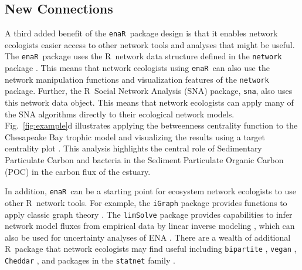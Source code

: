\documentclass[11pt]{article}
\newcommand{\R}{R}
\newcommand{\enaR}{\texttt{enaR}}
\begin{document}
\begin{spacing}{2}
\subsection{New Connections}
A third added benefit of the \enaR\ package design is that it enables
network ecologists easier access to other network tools and analyses
that might be useful.  The \enaR\ package uses the \R\ network data
structure defined in the \texttt{network} package
\citep{butts08_network}.  This means that network ecologists using \enaR\
can also use the network manipulation functions and visualization
features of the \texttt{network} package. Further, the \R\ Social
Network Analysis (SNA) package, \texttt{sna}, \citep{butts08_social} also uses this
network data object.  This means that network ecologists can apply
many of the SNA algorithms directly to their ecological network
models.  Fig.~\ref{fig:example}d illustrates applying the betweenness
centrality function to the Chesapeake Bay trophic model
\citep{baird89} and visualizing the results using a target
centrality plot \citep{brandes03}.  This analysis highlights the
central role of Sedimentary Particulate Carbon and bacteria in the
Sediment Particulate Organic Carbon (POC) in the carbon flux of the
estuary.

In addition, \enaR\ can be a starting point for ecosystem network
ecologists to use other \R\ network tools.  For example, the
\texttt{iGraph} package provides functions to apply classic graph
theory \citep{csardi06}.  The \texttt{limSolve} package provides
capabilities to infer network model fluxes from empirical data by
linear inverse modeling \citep{soetaert09}, which can also be used for
uncertainty analyses of ENA \citep{kones09}. There are a wealth of
additional \R\ package that network ecologists may find useful
including \texttt{bipartite} \citep{dormann2008}, \texttt{vegan}
\citep{dixon2003vegan}, \texttt{Cheddar}
\citep{hudson2013}, and packages in the \texttt{statnet} family
\citep{handcock2008statnet}.


\end{spacing}
\end{document}
